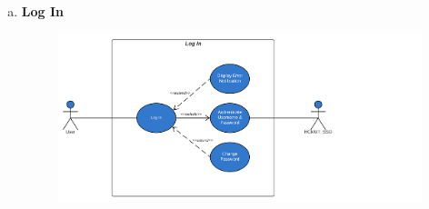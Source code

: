 \begin{enumerate}[a)]
    
    \newpage
    \item{\textbf{Log In}}
    \begin{center}
    \begin{figure}[!htp]
    \begin{center}
     \includegraphics[scale=.62]{images/Task1/login.png}
    \end{center}
    \label{refhinh1}
    \end{figure}
    \end{center}


\end{enumerate}
